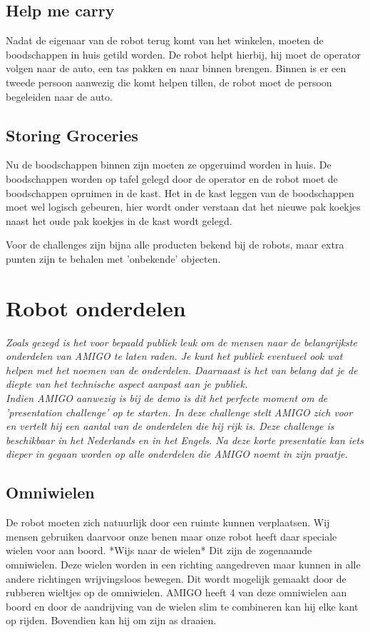\documentclass[a4paper,10pt]{article}
\numberwithin{equation}{section}
\numberwithin{figure}{section}
\numberwithin{table}{section}
\begin{document}
\subsection*{Help me carry}
Nadat de eigenaar van de robot terug komt van het winkelen, moeten de boodschappen in huis getild worden. De robot helpt hierbij, hij moet de operator volgen naar de auto, een tas pakken en naar binnen brengen. Binnen is er een tweede persoon aanwezig die komt helpen tillen, de robot moet de persoon begeleiden naar de auto.

\subsection*{Storing Groceries}
Nu de boodschappen binnen zijn moeten ze opgeruimd worden in huis. De boodschappen worden op tafel gelegd door de operator en de robot moet de boodschappen opruimen in de kast. Het in de kast leggen van de boodschappen moet wel logisch gebeuren, hier wordt onder verstaan dat het nieuwe pak koekjes naast het oude pak koekjes in de kast wordt gelegd.\

Voor de challenges zijn bijna alle producten bekend bij de robots, maar extra punten zijn te behalen met 'onbekende' objecten.  

\section*{Robot onderdelen}
\textit{Zoals gezegd is het voor bepaald publiek leuk om de mensen naar de belangrijkste onderdelen van AMIGO te laten raden. Je kunt het publiek eventueel ook wat helpen met het noemen van de onderdelen. Daarnaast is het van belang dat je de diepte van het technische aspect aanpast aan je publiek.}\\

\textit{Indien AMIGO aanwezig is bij de demo is dit het perfecte moment om de 'presentation challenge' op te starten. In deze challenge stelt AMIGO zich voor en vertelt hij een aantal van de onderdelen die hij rijk is. Deze challenge is beschikbaar in het Nederlands en in het Engels. Na deze korte presentatie kan iets dieper in gegaan worden op alle onderdelen die AMIGO noemt in zijn praatje.}\\

\subsection*{Omniwielen}
De robot moeten zich natuurlijk door een ruimte kunnen verplaatsen. Wij mensen gebruiken daarvoor onze benen maar onze robot heeft daar speciale wielen voor aan boord. *Wijs naar de wielen* Dit zijn de zogenaamde omniwielen. Deze wielen worden in een richting aangedreven maar kunnen in alle andere richtingen wrijvingsloos bewegen. Dit wordt mogelijk gemaakt door de rubberen wieltjes op de omniwielen. AMIGO heeft 4 van deze omniwielen aan boord en door de aandrijving van de wielen slim te combineren kan hij elke kant op rijden. Bovendien kan hij om zijn as draaien. \\
\end{document}
